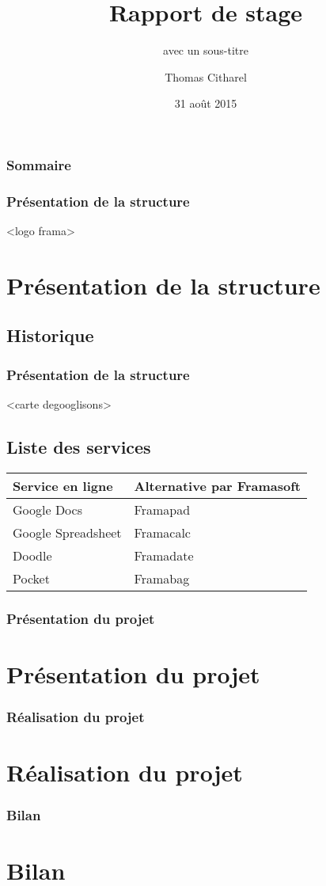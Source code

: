 \documentclass[12pt]{beamer}
\author{Thomas Citharel}
\title{Rapport de stage}
\subtitle{avec un sous-titre}
\institute{IUT d'Orléans}
\date{31 août 2015}
\begin{document}
	\maketitle
	
	\begin{frame}
		\frametitle{Sommaire}
		\tableofcontents
	\end{frame}
	\begin{frame}
		\frametitle{Présentation de la structure}
		<logo frama>
		\section{Présentation de la structure}
		\subsection{Historique}
	\end{frame}
	\begin{frame}
		\frametitle{Présentation de la structure}
		<carte degooglisons>
		\subsection{Liste des services}
		
		\begin{tabular}{|l|l|}
			\hline
			Service en ligne & Alternative par Framasoft \\
			\hline
			Google Docs & Framapad \\
			\hline
			Google Spreadsheet & Framacalc \\
			\hline
			Doodle & Framadate \\
			\hline
			Pocket & Framabag \\
			\hline
		\end{tabular}
	\end{frame}
	\begin{frame}
		\frametitle{Présentation du projet}
		\section{Présentation du projet}
	\end{frame}
	\begin{frame}
		\frametitle{Réalisation du projet}
		\section{Réalisation du projet}
	\end{frame}
	\begin{frame}
		\frametitle{Bilan}
		\section{Bilan}
	\end{frame}
\end{document}
